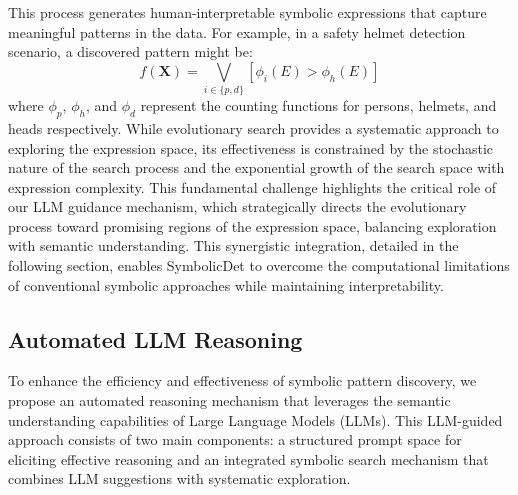 This process generates human-interpretable symbolic expressions that capture meaningful patterns in the data. For example, in a safety helmet detection scenario, a discovered pattern might be:
\begin{equation}
    f(\mathbf{X}) = \bigvee_{i \in \{p,d\}} [\phi_i(E) > \phi_h(E)]
\end{equation}
where $\phi_p$, $\phi_h$, and $\phi_d$ represent the counting functions for persons, helmets, and heads respectively.
While evolutionary search provides a systematic approach to exploring the expression space, its effectiveness is constrained by the stochastic nature of the search process and the exponential growth of the search space with expression complexity. This fundamental challenge highlights the critical role of our LLM guidance mechanism, which strategically directs the evolutionary process toward promising regions of the expression space, balancing exploration with semantic understanding. This synergistic integration, detailed in the following section, enables SymbolicDet to overcome the computational limitations of conventional symbolic approaches while maintaining interpretability.
%
\subsection{Automated LLM Reasoning}
To enhance the efficiency and effectiveness of symbolic pattern discovery, we propose an automated reasoning mechanism that leverages the semantic understanding capabilities of Large Language Models (LLMs). This LLM-guided approach consists of two main components: a structured prompt space for eliciting effective reasoning and an integrated symbolic search mechanism that combines LLM suggestions with systematic exploration.
%
